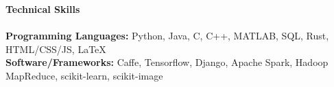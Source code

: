 \documentclass{article}
\begin{document}

\noindent
\textbf{\Large Technical Skills}\\[-2mm]
\HRule\\
\textbf{Programming Languages:} Python, Java, C, C++, MATLAB, SQL, Rust, HTML/CSS/JS, \LaTeX \\
\textbf{Software/Frameworks:} Caffe, Tensorflow, Django, Apache Spark, Hadoop MapReduce, scikit-learn, scikit-image

\end{document}
